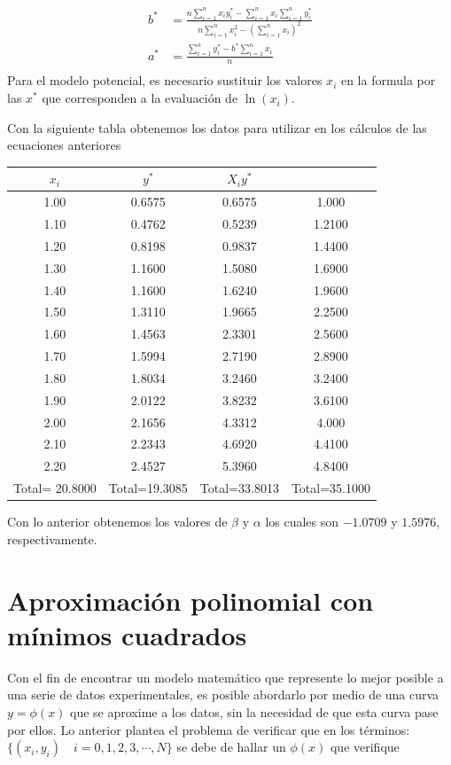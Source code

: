\documentclass[11pt,letterpaper]{article}
\begin{document}
\begin{align*}
	b^* &= \frac{n \sum_{i=1}^{n} x_iy_i^* - \sum_{i=1}^{n} x_i \sum_{i=1}^{n} y_i^*}{n\sum_{i=1}^{n} x_i^2 - (\sum_{i=1}^{n}  x_i)^2} \\
	a^* &= \frac{\sum_{i=1}^{n} y_i^* - b^* \sum_{i=1}^{n} x_i  }{n} \\
\end{align*}
Para el modelo potencial, es necesario sustituir los valores $x_i$ en la formula por las $x^*$ que corresponden a la evaluación de $\ln(x_i)$.
\par Con la siguiente tabla obtenemos los datos para utilizar en los cálculos de las ecuaciones anteriores
\begin{table}[H]
	\centering
	\begin{tabular}{c | c | c | c}
		$x_i$ & $y^*$ &	$X_iy^*$ & \\ \hline
		1.00 & 	0.6575 &	0.6575	& 1.000 \\
1.10 & 	0.4762 &	0.5239	& 1.2100 \\
1.20 & 	0.8198 &	0.9837	& 1.4400 \\
1.30 & 	1.1600 &	1.5080	& 1.6900 \\
1.40 & 	1.1600 &	1.6240	& 1.9600 \\
1.50 & 	1.3110 &	1.9665	& 2.2500 \\
1.60 & 	1.4563 &	2.3301	& 2.5600 \\
1.70 & 	1.5994 &	2.7190	& 2.8900 \\
1.80 & 	1.8034 &	3.2460	& 3.2400 \\
1.90 & 	2.0122 &	3.8232	& 3.6100 \\
2.00 & 	2.1656 &	4.3312	& 4.000 \\
2.10 & 	2.2343 &	4.6920	& 4.4100 \\
2.20 & 	2.4527 &    5.3960	& 4.8400 \\ \hline
Total= 20.8000 &	Total=19.3085	& Total=33.8013	& Total=35.1000 \\ \hline
	\end{tabular}
\end{table}
Con lo anterior obtenemos los valores  de $\beta$ y $\alpha$ los cuales son $-1.0709$ y $1.5976$, respectivamente.
\section{Aproximación polinomial con mínimos cuadrados}
Con el fin de encontrar un modelo matemático que represente lo mejor posible a una serie de datos experimentales, es posible abordarlo por medio de una curva $y=\phi(x)$ que se aproxime a los datos, sin la necesidad de que esta curva pase por ellos.
Lo anterior plantea el problema de verificar que en los términos:
$\{(x_i, y_i)\quad i = 0,1,2,3, \cdots, N\} $ se debe de hallar un $\phi(x)$ que verifique
\end{document}
